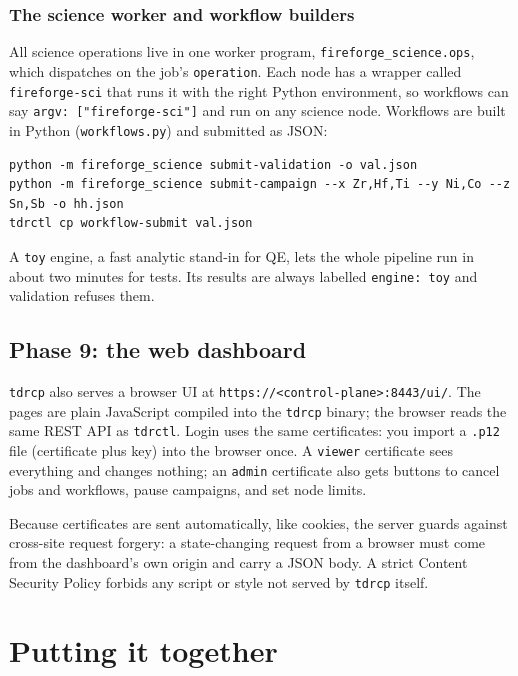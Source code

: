 \documentclass[11pt,a4paper]{report}
\newcommand{\code}[1]{\texttt{#1}}
\begin{document}
\section{The science worker and workflow builders}

All science operations live in one worker program, \code{fireforge\_science.ops}, which dispatches
on the job's \code{operation}. Each node has a wrapper called \code{fireforge-sci} that runs it with
the right Python environment, so workflows can say \code{argv: ["fireforge-sci"]} and run on any
science node. Workflows are built in Python (\code{workflows.py}) and submitted as JSON:

\begin{lstlisting}
python -m fireforge_science submit-validation -o val.json
python -m fireforge_science submit-campaign --x Zr,Hf,Ti --y Ni,Co --z Sn,Sb -o hh.json
tdrctl cp workflow-submit val.json
\end{lstlisting}

A \code{toy} engine, a fast analytic stand-in for QE, lets the whole pipeline run in about two
minutes for tests. Its results are always labelled \code{engine: toy} and validation refuses them.

\chapter{Phase 9: the web dashboard}

\code{tdrcp} also serves a browser UI at \code{https://<control-plane>:8443/ui/}. The pages are
plain JavaScript compiled into the \code{tdrcp} binary; the browser reads the same REST API as
\code{tdrctl}. Login uses the same certificates: you import a \code{.p12} file (certificate plus key)
into the browser once. A \code{viewer} certificate sees everything and changes nothing; an
\code{admin} certificate also gets buttons to cancel jobs and workflows, pause campaigns, and set
node limits.

Because certificates are sent automatically, like cookies, the server guards against cross-site
request forgery: a state-changing request from a browser must come from the dashboard's own origin
and carry a JSON body. A strict Content Security Policy forbids any script or style not served by
\code{tdrcp} itself.

\part{Putting it together}
\end{document}
